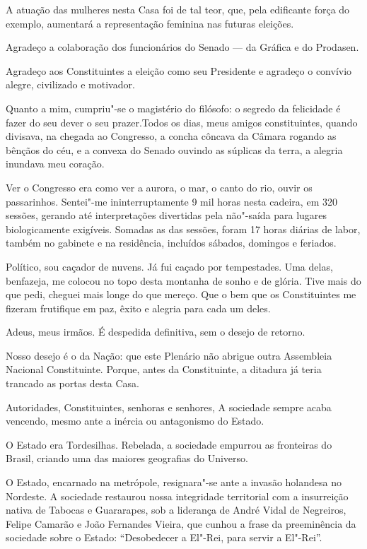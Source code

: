 A atuação das mulheres nesta Casa foi de tal teor, que, pela edificante
força do exemplo, aumentará a representação feminina nas futuras
eleições.

Agradeço a colaboração dos funcionários do Senado --- da Gráfica e do
Prodasen.

Agradeço aos Constituintes a eleição como seu Presidente e agradeço o
convívio alegre, civilizado e motivador.

Quanto a mim, cumpriu"-se o magistério do filósofo: o segredo da
felicidade é fazer do seu dever o seu prazer.Todos os dias, meus amigos
constituintes, quando divisava, na chegada ao Congresso, a concha
côncava da Câmara rogando as bênçãos do céu, e a convexa do Senado
ouvindo as súplicas da terra, a alegria inundava meu coração.

Ver o Congresso era como ver a aurora, o mar, o canto do rio, ouvir os
passarinhos. Sentei"-me ininterruptamente 9 mil horas nesta cadeira, em
320 sessões, gerando até interpretações divertidas pela não"-saída para
lugares biologicamente exigíveis. Somadas as das sessões, foram 17 horas
diárias de labor, também no gabinete e na residência, incluídos sábados,
domingos e feriados.

Político, sou caçador de nuvens. Já fui caçado por tempestades. Uma
delas, benfazeja, me colocou no topo desta montanha de sonho e de
glória. Tive mais do que pedi, cheguei mais longe do que mereço. Que o
bem que os Constituintes me fizeram frutifique em paz, êxito e alegria
para cada um deles.

Adeus, meus irmãos. É despedida definitiva, sem o desejo de retorno.

Nosso desejo é o da Nação: que este Plenário não abrigue outra
Assembleia Nacional Constituinte. Porque, antes da Constituinte, a
ditadura já teria trancado as portas desta Casa.

Autoridades, Constituintes, senhoras e senhores, A sociedade sempre
acaba vencendo, mesmo ante a inércia ou antagonismo do Estado.

O Estado era Tordesilhas. Rebelada, a sociedade empurrou as fronteiras
do Brasil, criando uma das maiores geografias do Universo.

O Estado, encarnado na metrópole, resignara"-se ante a invasão holandesa
no Nordeste. A sociedade restaurou nossa integridade territorial com a
insurreição nativa de Tabocas e Guararapes, sob a liderança de André
Vidal de Negreiros, Felipe Camarão e João Fernandes Vieira, que cunhou a
frase da preeminência da sociedade sobre o Estado: ``Desobedecer a
El"-Rei, para servir a El"-Rei''.

